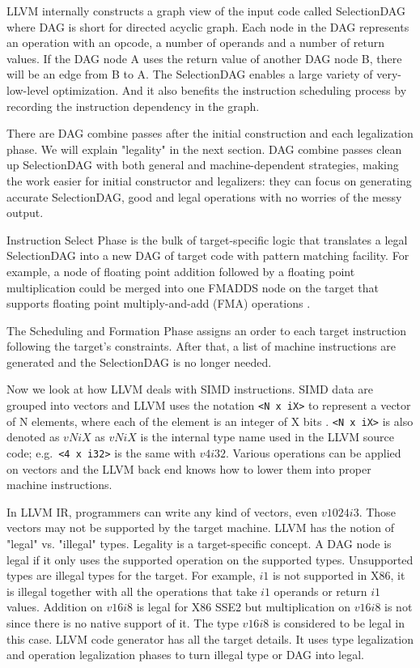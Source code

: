 LLVM internally constructs a graph view of the input code called SelectionDAG where DAG is short for directed acyclic graph. Each node in the DAG represents an operation with an opcode, a number of operands and a number of return values. If the DAG node A uses the return value of another DAG node B, there will be an edge from B to A. The SelectionDAG enables a large variety of very-low-level optimization. And it also benefits the instruction scheduling process by recording the instruction dependency in the graph.

There are DAG combine passes after the initial construction and each legalization phase\cite{llvm_code_gen}. We will explain "legality" in the next section. DAG combine passes clean up SelectionDAG with both general and machine-dependent strategies, making the work easier for initial constructor and legalizers: they can focus on generating accurate SelectionDAG, good and legal operations with no worries of the messy output.

Instruction Select Phase is the bulk of target-specific logic that translates a legal SelectionDAG into a new DAG of target code with pattern matching facility. For example, a node of floating point addition followed by a floating point multiplication could be merged into one FMADDS node on the target that supports floating point multiply-and-add (FMA) operations \cite{llvm_code_gen}.

The Scheduling and Formation Phase assigns an order to each target instruction following the target's constraints. After that, a list of machine instructions are generated and the SelectionDAG is no longer needed.

Now we look at how LLVM deals with SIMD instructions. SIMD data are grouped into vectors and LLVM uses the notation \verb|<N x iX>| to represent a vector of N elements, where each of the element is an integer of X bits \cite{llvm_lang_ref, hybrid_simd_type_legalize}. \verb|<N x iX>| is also denoted as $vNiX$ as $vNiX$ is the internal type name used in the LLVM source code; e.g.\ \verb|<4 x i32>| is the same with $v4i32$. Various operations can be applied on vectors and the LLVM back end knows how to lower them into proper machine instructions.

In LLVM IR, programmers can write any kind of vectors, even $v1024i3$. Those vectors may not be supported by the target machine. LLVM has the notion of "legal" vs. "illegal" types. Legality is a target-specific concept. A DAG node is legal if it only uses the supported operation on the supported types. Unsupported types are illegal types for the target. For example, $i1$ is not supported in X86, it is illegal together with all the operations that take $i1$ operands or return $i1$ values. Addition on $v16i8$ is legal for X86 SSE2 but multiplication on $v16i8$ is not since there is no native support of it. The type $v16i8$ is considered to be legal in this case. LLVM code generator has all the target details. It uses type legalization and operation legalization phases to turn illegal type or DAG into legal\cite{llvm_code_gen}.


